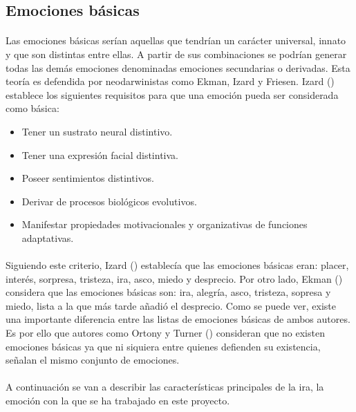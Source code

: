 
\subsection{Emociones básicas}
\paragraph{}
Las emociones básicas serían aquellas que tendrían un carácter universal, innato y que son distintas entre ellas. A partir de sus combinaciones se podrían generar todas las demás emociones denominadas emociones secundarias o derivadas. Esta teoría es defendida por neodarwinistas como Ekman, Izard y Friesen. Izard (\citeyear{izard1992basic}) establece los siguientes requisitos para que una emoción pueda ser considerada como básica:

\begin{itemize}
    \item Tener un sustrato neural distintivo.
    \item Tener una expresión facial distintiva.
    \item Poseer sentimientos distintivos.
    \item Derivar de procesos biológicos evolutivos.
    \item Manifestar propiedades motivacionales y organizativas de funciones \\ adaptativas.
\end{itemize}

\paragraph{}
Siguiendo este criterio, Izard (\citeyear{izard1992basic}) establecía que las emociones básicas eran: placer, interés, sorpresa, tristeza, ira, asco, miedo y desprecio. Por otro lado, Ekman (\citeyear{ekman1992argument}) considera que las emociones básicas son: ira, alegría, asco, tristeza, sopresa y miedo, lista a la que más tarde añadió el desprecio. Como se puede ver, existe una importante diferencia entre las listas de emociones básicas de ambos autores. Es por ello que autores como Ortony y Turner (\citeyear{ortony1990s}) consideran que no existen emociones básicas ya que ni siquiera entre quienes defienden su existencia, señalan el mismo conjunto de emociones.

\paragraph{}
A continuación se van a describir las características principales de la ira, la emoción con la que se ha trabajado en este proyecto.


